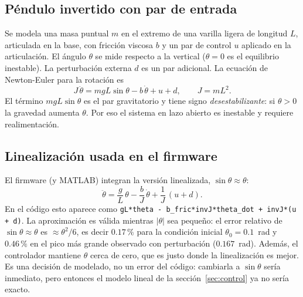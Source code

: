\documentclass[11pt,a4paper]{article}
\begin{document}
\subsection{P\'endulo invertido con par de entrada}
Se modela una masa puntual $m$ en el extremo de una varilla ligera de longitud $L$,
articulada en la base, con fricci\'on viscosa $b$ y un par de control $u$ aplicado en la
articulaci\'on. El \'angulo $\theta$ se mide respecto a la vertical ($\theta=0$ es el equilibrio
inestable). La perturbaci\'on externa $d$ es un par adicional. La ecuaci\'on de Newton-Euler
para la rotaci\'on es
\begin{equation}
J\,\ddot\theta = m g L \sin\theta - b\,\dot\theta + u + d, \qquad J = mL^2 .
\label{eq:nolineal}
\end{equation}
El t\'ermino $mgL\sin\theta$ es el par gravitatorio y tiene signo \emph{desestabilizante}:
si $\theta>0$ la gravedad aumenta $\theta$. Por eso el sistema en lazo abierto es inestable
y requiere realimentaci\'on.

\subsection{Linealizaci\'on usada en el firmware}
El firmware (y MATLAB) integran la versi\'on linealizada, $\sin\theta\approx\theta$:
\begin{equation}
\ddot\theta = \frac{g}{L}\,\theta - \frac{b}{J}\,\dot\theta + \frac{1}{J}\,(u+d).
\label{eq:lineal}
\end{equation}
En el c\'odigo esto aparece como \texttt{gL*theta - b\_fric*invJ*theta\_dot + invJ*(u + d)}.
La aproximaci\'on es v\'alida mientras $|\theta|$ sea peque\~no: el error relativo de
$\sin\theta\approx\theta$ es $\approx\theta^2/6$, es decir $0.17\,\%$ para la condici\'on inicial
$\theta_0=0.1$~rad y $0.46\,\%$ en el pico m\'as grande observado con perturbaci\'on
($0.167$~rad). Adem\'as, el controlador mantiene $\theta$ cerca de cero, que es justo
donde la linealizaci\'on es mejor. Es una decisi\'on de modelado, no un error del c\'odigo:
cambiarla a $\sin\theta$ ser\'ia inmediato, pero entonces el modelo lineal de la
secci\'on~\ref{sec:control} ya no ser\'ia exacto.
\end{document}
